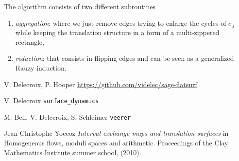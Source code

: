 \documentclass{article}
\begin{document}
The algorithm consists of two different subroutines
\begin{enumerate}
\item \emph{aggregation}: where we just remove edges trying to enlarge the cycles
of $\sigma_f$ while keeping the translation structure in a form of a multi-zippered rectangle,
\item \emph{reduction}: that consists in flipping edges and can be seen
as a generalized Rauzy induction.
\end{enumerate}


%
%
%
%

\begin{thebibliography}{sage-flatsurf}

V. Delecroix, P. Hooper
\url{https://github.com/videlec/sage-flatsurf}

V. Delecroix
\texttt{surface\_dynamics}

M. Bell, V. Delecroix, S. Schleimer
\texttt{veerer}

Jean-Christophe Yoccoz
\textit{Interval exchange maps and translation surfaces}
in Homogeneous flows, moduli spaces and arithmetic.
Proceedings of the Clay Mathematics Institute summer school,
(2010).
\end{thebibliography}
\end{document}
